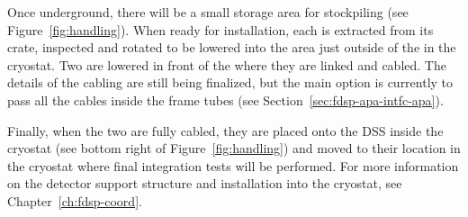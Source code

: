 Once underground, there will be a small storage area for stockpiling  (see Figure~\ref{fig:handling}). When ready for installation, each  is extracted from its crate, inspected and rotated to be lowered into the area just outside of the  in the cryostat. Two  are lowered in front of the  where they are linked and cabled. The details of the cabling are still being finalized, but the main option is currently to pass all the cables inside the  frame tubes (see Section~\ref{sec:fdsp-apa-intfc-apa}).



Finally, when the two  are fully cabled, they are placed onto the DSS inside the cryostat (see bottom right of Figure~\ref{fig:handling}) and moved to their location in the cryostat where final integration tests will be performed.  For more information on the detector support structure and installation into the cryostat, see %
Chapter~\ref{ch:fdsp-coord}. 

